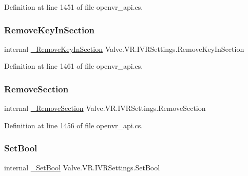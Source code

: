 Definition at line 1451 of file openvr\+\_\+api.\+cs.

\mbox{\label{struct_valve_1_1_v_r_1_1_i_v_r_settings_aa3dc004adcefa359f9362127f08de95d}} 
\subsubsection{\texorpdfstring{RemoveKeyInSection}{RemoveKeyInSection}}
{\footnotesize\ttfamily internal \mbox{\hyperlink{struct_valve_1_1_v_r_1_1_i_v_r_settings_ae4d9e9b9f88da0eeb2887610e1c5ff89}{\+\_\+\+Remove\+Key\+In\+Section}} Valve.\+V\+R.\+I\+V\+R\+Settings.\+Remove\+Key\+In\+Section}



Definition at line 1461 of file openvr\+\_\+api.\+cs.

\mbox{\label{struct_valve_1_1_v_r_1_1_i_v_r_settings_adf937cedc2d8789bc171b687f31ae51b}} 
\subsubsection{\texorpdfstring{RemoveSection}{RemoveSection}}
{\footnotesize\ttfamily internal \mbox{\hyperlink{struct_valve_1_1_v_r_1_1_i_v_r_settings_a1bff5a9ce11b6a9f192cc9d9d34fbcfc}{\+\_\+\+Remove\+Section}} Valve.\+V\+R.\+I\+V\+R\+Settings.\+Remove\+Section}



Definition at line 1456 of file openvr\+\_\+api.\+cs.

\mbox{\label{struct_valve_1_1_v_r_1_1_i_v_r_settings_ab4a981f354375bf04f8c0caae4603ab4}} 
\subsubsection{\texorpdfstring{SetBool}{SetBool}}
{\footnotesize\ttfamily internal \mbox{\hyperlink{struct_valve_1_1_v_r_1_1_i_v_r_settings_a9d815c8edfd5d547eddfa9ae2c165714}{\+\_\+\+Set\+Bool}} Valve.\+V\+R.\+I\+V\+R\+Settings.\+Set\+Bool}



